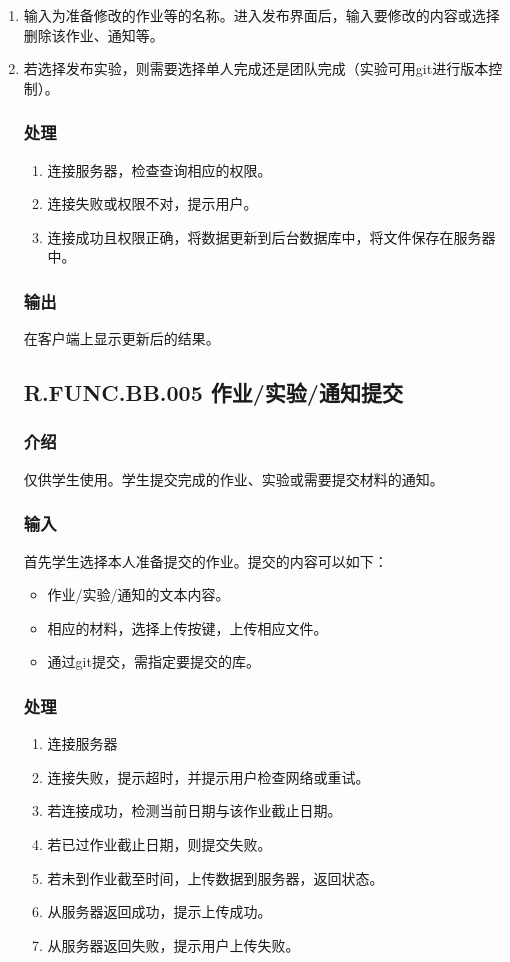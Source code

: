 	\begin{enumerate}
      \item 输入为准备修改的作业等的名称。进入发布界面后，输入要修改的内容或选择删除该作业、通知等。
	\item 若选择发布实验，则需要选择单人完成还是团队完成（实验可用git进行版本控制）。
      \subsubsection{处理}
      \begin{enumerate}
        \item 连接服务器，检查查询相应的权限。
        \item 连接失败或权限不对，提示用户。
        \item 连接成功且权限正确，将数据更新到后台数据库中，将文件保存在服务器中。
      \end{enumerate}
      \subsubsection{输出}
      在客户端上显示更新后的结果。

    \subsection{R.FUNC.BB.005 作业/实验/通知提交}
      \subsubsection{介绍}
      仅供学生使用。学生提交完成的作业、实验或需要提交材料的通知。
      \subsubsection{输入}
      首先学生选择本人准备提交的作业。提交的内容可以如下：
      \begin{itemize}
        \item 作业/实验/通知的文本内容。
        \item 相应的材料，选择上传按键，上传相应文件。
	   \item 通过git提交，需指定要提交的库。
      \end{itemize}
      \subsubsection{处理}
      \begin{enumerate}
        \item 连接服务器
        \item 连接失败，提示超时，并提示用户检查网络或重试。
        \item 若连接成功，检测当前日期与该作业截止日期。
        \item 若已过作业截止日期，则提交失败。
        \item 若未到作业截至时间，上传数据到服务器，返回状态。
        \item 从服务器返回成功，提示上传成功。
        \item 从服务器返回失败，提示用户上传失败。
      \end{enumerate}

\end{enumerate}
